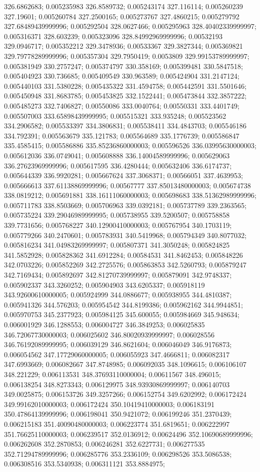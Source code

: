 326.6862683; 0.005235983 326.8589732; 0.005243174 327.116114; 0.005260239 327.19601; 0.005260784 327.2500165; 0.005273767 327.4860215; 0.005279792 327.68489439999996; 0.005292504 328.0627466; 0.005295963 328.40402339999997; 0.005316371 328.603239; 0.005323096 328.84992969999996; 0.00532193 329.0946717; 0.005352212 329.3478936; 0.00533367 329.3827344; 0.005369821 329.79778289999996; 0.005357304 329.7950419; 0.0053809 329.99153789999997; 0.005381949 330.2757247; 0.005374797 330.358169; 0.005399481 330.5847518; 0.005404923 330.736685; 0.005409549 330.963589; 0.005424904 331.2147124; 0.005440103 331.5380228; 0.005435322 331.4594758; 0.005442591 331.5501646; 0.005450948 331.8683785; 0.005453825 332.1522441; 0.005473844 332.3857222; 0.005485273 332.7406827; 0.00550086 333.0040764; 0.00550331 333.4401749; 0.005507003 333.65898439999995; 0.005515321 333.935248; 0.005523562 334.2906582; 0.005533397 334.3806831; 0.005538411 334.4843703; 0.005546186 334.792391; 0.005563679 335.121783; 0.005564689 335.1776739; 0.005586847 335.4585415; 0.005586886 335.85236860000003; 0.005596526 336.03995630000003; 0.005612036 336.0749041; 0.005608888 336.14004589999996; 0.005629063 336.27623969999996; 0.005617595 336.4280444; 0.005632406 336.6174737; 0.005644339 336.9920281; 0.005667624 337.3068371; 0.00566051 337.4639953; 0.005666613 337.61138869999996; 0.00567777 337.85013480000003; 0.005674738 338.0819212; 0.005691881 338.16111060000003; 0.005698683 338.51362989999996; 0.005711783 338.8503669; 0.005706963 339.0392181; 0.005737789 339.2363565; 0.005735224 339.29046989999995; 0.005738955 339.5200507; 0.005758858 339.7731656; 0.005768227 340.12900410000003; 0.005767954 340.1703119; 0.005779266 340.2470601; 0.005783931 340.5419968; 0.005794349 340.8077032; 0.005816234 341.04983269999997; 0.005807371 341.3050248; 0.005824825 341.5852928; 0.005828362 341.6912284; 0.00584531 341.8462453; 0.005848226 342.0703226; 0.005852269 342.2725576; 0.005863853 342.5260793; 0.005879247 342.7169434; 0.005892697 342.81270739999997; 0.005879091 342.9748337; 0.005902337 343.3260252; 0.005904903 343.6205337; 0.005918119 343.92600610000005; 0.005924999 344.0886677; 0.005938955 344.4810387; 0.005941326 344.576203; 0.005954542 344.8199386; 0.005962162 344.9944851; 0.005970753 345.2377923; 0.005984125 345.600055; 0.005984669 345.948634; 0.006001929 346.1288553; 0.006004727 346.3849253; 0.006025835 346.72067730000003; 0.006025602 346.80020939999997; 0.006028556 346.76192089999995; 0.006039129 346.8621604; 0.006046049 346.9176873; 0.006054562 347.17729060000005; 0.006055923 347.4666811; 0.006082317 347.6993669; 0.006082667 347.8748985; 0.006092035 348.1096615; 0.006106107 348.221229; 0.006113531 348.37693110000004; 0.00611567 348.496015; 0.006138254 348.8273343; 0.006129975 348.93930869999997; 0.006140703 349.0025875; 0.006153726 349.3257266; 0.006152754 349.6202992; 0.006172424 349.99162010000003; 0.006172424 350.10419410000003; 0.006183191 350.47864139999996; 0.006198041 350.9421072; 0.006199246 351.2370439; 0.006215183 351.40090480000003; 0.006223774 351.6819651; 0.006222997 351.76625110000003; 0.006239517 352.0136912; 0.00624496 352.10690689999996; 0.006262608 352.2870853; 0.006246281 352.6227731; 0.006277535 352.71294789999996; 0.006285776 353.2336109; 0.006298526 353.5086538; 0.006308516 353.5340938; 0.006311121 353.8884975; 
